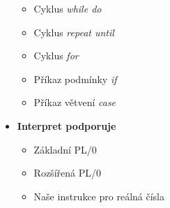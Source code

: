 \documentclass[
12pt,
a4paper,
pdftex,
czech,
titlepage
]{report}
\begin{document}
\begin{itemize}
\begin{itemize}
\item Cyklus \textit{while do}
\item Cyklus \textit{repeat until}
\item Cyklus \textit{for}
\item Příkaz podmínky \textit{if}
\item Příkaz větvení \textit{case}
\end{itemize}
\item \textbf{Interpret podporuje}
\begin{itemize}
\item Základní PL/0
\item Rozšířená PL/0
\item Naše instrukce pro reálná čísla
\end{itemize}
\end{itemize}
\end{document}
